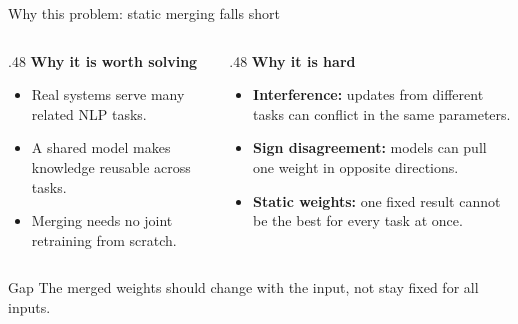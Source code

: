 \begin{frame}{Why this problem: static merging falls short}
  \begin{columns}[T]
    \begin{column}{.48\linewidth}
      \textbf{Why it is worth solving}
      \begin{itemize}
        \item Real systems serve many related NLP tasks.
        \item A shared model makes knowledge reusable across tasks.
        \item Merging needs no joint retraining from scratch.
      \end{itemize}
    \end{column}
    \begin{column}{.48\linewidth}
      \textbf{Why it is hard}
      \begin{itemize}
        \item \textbf{Interference:} updates from different tasks can conflict in the same parameters.
        \item \textbf{Sign disagreement:} models can pull one weight in opposite directions.
        \item \textbf{Static weights:} one fixed result cannot be the best for every task at once.
      \end{itemize}
    \end{column}
  \end{columns}
  \vfill
  \begin{block}{Gap}
    The merged weights should change with the input, not stay fixed for all inputs.
  \end{block}
\end{frame}
